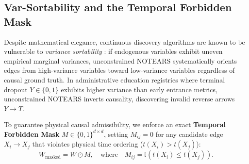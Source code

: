 \subsection{Var-Sortability and the Temporal Forbidden Mask}

Despite mathematical elegance, continuous discovery algorithms are known to be vulnerable to \textit{variance sortability} \parencite{reisach2021varsortability}: if endogenous variables exhibit uneven empirical marginal variances, unconstrained NOTEARS systematically orients edges from high-variance variables toward low-variance variables regardless of causal ground truth. In administrative education registries where terminal dropout $Y \in \{0, 1\}$ exhibits higher variance than early entrance metrics, unconstrained NOTEARS inverts causality, discovering invalid reverse arrows $Y \to T$.

To guarantee physical causal admissibility, we enforce an exact \textbf{Temporal Forbidden Mask} $M \in \{0, 1\}^{d \times d}$, setting $M_{ij} = 0$ for any candidate edge $X_i \to X_j$ that violates physical time ordering ($t(X_i) > t(X_j)$):
\begin{equation}
    W_{\text{masked}} = W \odot M, \quad \text{where} \quad M_{ij} = \mathbb{I}(t(X_i) \le t(X_j)).
    \label{eq:temporal_mask_formula}
\end{equation}
